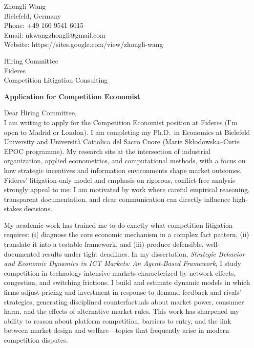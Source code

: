 \documentclass[11pt]{article}
\begin{document}
\noindent
Zhongli Wang \\
Bielefeld, Germany \\
Phone: +49 160 9541 6015 \\
Email: nkwangzhongli@gmail.com \\
Website: https://sites.google.com/view/zhongli-wang \\

\vspace{0.35cm}

\noindent
Hiring Committee \\
Fideres \\
Competition Litigation Consulting \\

\vspace{0.35cm}

\noindent
\textbf{Application for Competition Economist} \\

\vspace{0.25cm}

\noindent Dear Hiring Committee, \\[0.15cm]

\noindent
I am writing to apply for the Competition Economist position at Fideres (I'm open to Madrid or London). I am completing my Ph.D.\ in Economics at Bielefeld University and Universit\`a Cattolica del Sacro Cuore (Marie Sk{\l}odowska--Curie EPOC programme). My research sits at the intersection of industrial organization, applied econometrics, and computational methods, with a focus on how strategic incentives and information environments shape market outcomes. Fideres' litigation-only model and emphasis on rigorous, conflict-free analysis strongly appeal to me: I am motivated by work where careful empirical reasoning, transparent documentation, and clear communication can directly influence high-stakes decisions.

\vspace{0.2cm}

\noindent
My academic work has trained me to do exactly what competition litigation requires: (i) diagnose the core economic mechanism in a complex fact pattern, (ii) translate it into a testable framework, and (iii) produce defensible, well-documented results under tight deadlines. In my dissertation, \textit{Strategic Behavior and Economic Dynamics in ICT Markets: An Agent-Based Framework}, I study competition in technology-intensive markets characterized by network effects, congestion, and switching frictions. I build and estimate dynamic models in which firms adjust pricing and investment in response to demand feedback and rivals' strategies, generating disciplined counterfactuals about market power, consumer harm, and the effects of alternative market rules. This work has sharpened my ability to reason about platform competition, barriers to entry, and the link between market design and welfare---topics that frequently arise in modern competition disputes.
\end{document}
